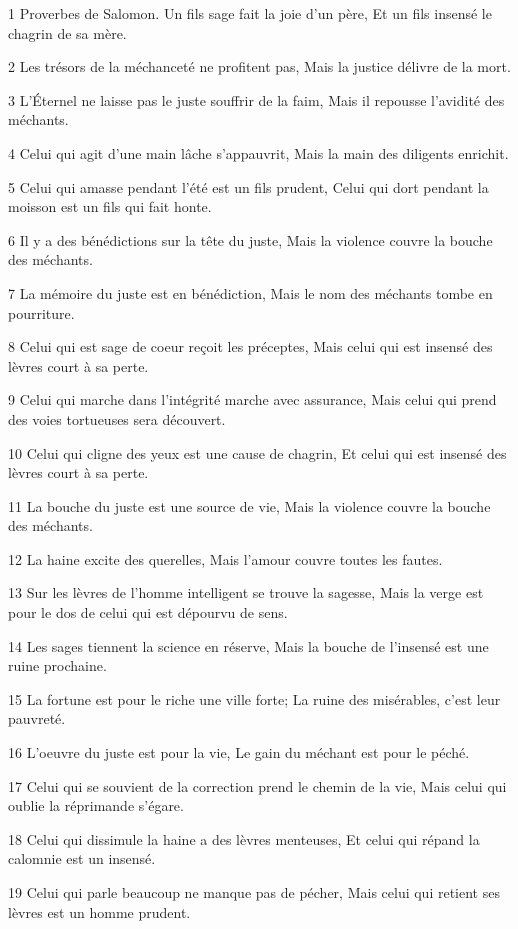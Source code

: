 \par 1 Proverbes de Salomon. Un fils sage fait la joie d'un père, Et un fils insensé le chagrin de sa mère.
\par 2 Les trésors de la méchanceté ne profitent pas, Mais la justice délivre de la mort.
\par 3 L'Éternel ne laisse pas le juste souffrir de la faim, Mais il repousse l'avidité des méchants.
\par 4 Celui qui agit d'une main lâche s'appauvrit, Mais la main des diligents enrichit.
\par 5 Celui qui amasse pendant l'été est un fils prudent, Celui qui dort pendant la moisson est un fils qui fait honte.
\par 6 Il y a des bénédictions sur la tête du juste, Mais la violence couvre la bouche des méchants.
\par 7 La mémoire du juste est en bénédiction, Mais le nom des méchants tombe en pourriture.
\par 8 Celui qui est sage de coeur reçoit les préceptes, Mais celui qui est insensé des lèvres court à sa perte.
\par 9 Celui qui marche dans l'intégrité marche avec assurance, Mais celui qui prend des voies tortueuses sera découvert.
\par 10 Celui qui cligne des yeux est une cause de chagrin, Et celui qui est insensé des lèvres court à sa perte.
\par 11 La bouche du juste est une source de vie, Mais la violence couvre la bouche des méchants.
\par 12 La haine excite des querelles, Mais l'amour couvre toutes les fautes.
\par 13 Sur les lèvres de l'homme intelligent se trouve la sagesse, Mais la verge est pour le dos de celui qui est dépourvu de sens.
\par 14 Les sages tiennent la science en réserve, Mais la bouche de l'insensé est une ruine prochaine.
\par 15 La fortune est pour le riche une ville forte; La ruine des misérables, c'est leur pauvreté.
\par 16 L'oeuvre du juste est pour la vie, Le gain du méchant est pour le péché.
\par 17 Celui qui se souvient de la correction prend le chemin de la vie, Mais celui qui oublie la réprimande s'égare.
\par 18 Celui qui dissimule la haine a des lèvres menteuses, Et celui qui répand la calomnie est un insensé.
\par 19 Celui qui parle beaucoup ne manque pas de pécher, Mais celui qui retient ses lèvres est un homme prudent.
